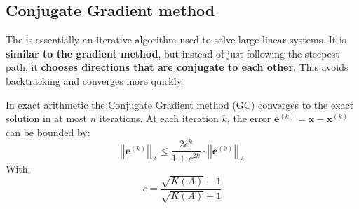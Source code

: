 \subsection{Conjugate Gradient method}

The  is essentially an iterative algorithm used to solve large linear systems. It is \textbf{similar to the gradient method}, but instead of just following the steepest path, it \textbf{chooses directions that are conjugate to each other}. This avoids backtracking and converges more quickly.

\highspace
\begin{theorem}
    In exact arithmetic the Conjugate Gradient method (GC) converges to the exact solution in at most $n$ iterations. At each iteration $k$, the error $\mathbf{e}^{\left(k\right)} = \mathbf{x} - \mathbf{x}^{\left(k\right)}$ can be bounded by:
    \begin{equation}\label{eq: bound error conjugate gradient}
        {\left|\left|\mathbf{e}^{\left(k\right)}\right|\right|}_{A} \le \dfrac{
            2c^{k}
        }{
            1+c^{2k}
        }
        \cdot
        {\left|\left|\mathbf{e}^{\left(0\right)}\right|\right|}_{A}
    \end{equation}
    With:
    \begin{equation}\label{eq: bound c conjugate gradient}
        c = \dfrac{
            \sqrt{K\left(A\right)} - 1
        }{
            \sqrt{K\left(A\right)} + 1
        }
    \end{equation}
\end{theorem}

